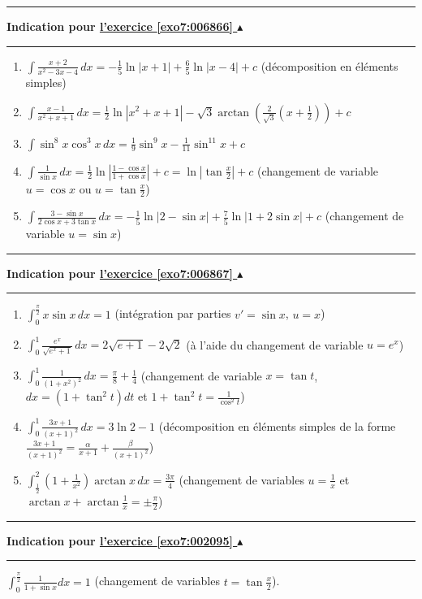 \documentclass[11pt,a4paper]{article}
\newcounter{exo}
\newcommand{\indication}[1]{\hypertarget{ind7:#1}{}\label{ind7:#1}{\bf Indication pour \hyperlink{exo7:#1}{l'exercice \ref{exo7:#1} $\blacktriangle$}}\vspace{1mm}\hrule\vspace{1mm}}
\newcommand{\finindication}{\vspace{1mm}\hrule\vspace*{7mm}}
\begin{document}
\finindication
\indication{006866}
\begin{enumerate}
  \item $\int \frac{x+2}{x^2-3x-4}\,dx=-\frac 15\ln \left| x+1\right| +\frac 65\ln
\left| x-4\right| +c$ (décomposition en éléments simples)

  \item $\int \frac{x-1}{x^2+x+1}\,dx= \frac 12 \ln|x^2+x+1| - 
\sqrt3 \arctan \left( \frac{2}{\sqrt3}\left(x+\frac 12\right) \right) + c$

  \item $\int \sin ^8x\cos ^3x \, dx=\frac 19\sin ^9x-\frac 1{11}\sin ^{11}x+c$

  \item $\int \frac 1{\sin x} \, dx=\frac 12\ln \left| \frac{1-\cos x}{1+\cos x}%
\right| +c=\ln \left| \tan \frac x2\right| +c$ (changement de variable $u=\cos x$ ou $u=\tan \frac
x2$)

  \item $\int \frac{3-\sin x}{2\cos x+3\tan x}\,dx=-\frac 15\ln |2-\sin x| + \frac 75 \ln |1+2\sin x| + c$  
(changement de variable $u=\sin x$)
\end{enumerate}
\finindication
\indication{006867}
\begin{enumerate}
  \item $\int_0^{\frac \pi 2}x\sin x \, dx=1$ (intégration par parties $v'=\sin x$, $u=x$)

  \item $\int_0^1 \frac{e^x}{\sqrt{e^x+1}} \,  dx=2\sqrt{e+1} -2\sqrt 2$ (à l'aide du changement de variable $u=e^x$)

  \item $\int_0^1\frac 1{\left( 1+x^2\right) ^2} \, dx=\frac \pi 8+\frac 14$
(changement de variable $x=\tan t$, $dx = (1+\tan^2 t) dt$ et $1+\tan^2 t = \frac{1}{\cos^2 t}$)

  \item $\int_0^1\frac{3x+1}{\left( x+1\right) ^2} \, dx=3\ln 2-1$ (décomposition en
éléments simples de la forme
$\frac{3x+1}{\left( x+1\right) ^2} = \frac{\alpha}{x+1}+\frac{\beta}{(x+1)^2}$)

  \item $\int_{\frac 12}^2\left( 1+\frac 1{x^2}\right) \arctan x \, dx=\frac{3\pi }4$
(changement de variables $u=\frac 1x$ et $\arctan x+\arctan \frac 1x= \pm \frac \pi 2$)

\end{enumerate}
\finindication
\indication{002095}
$\int_0^{\frac \pi 2}\frac 1{1+\sin x}dx=1$ (changement de variables $t=\tan \frac x2$).
\end{document}
